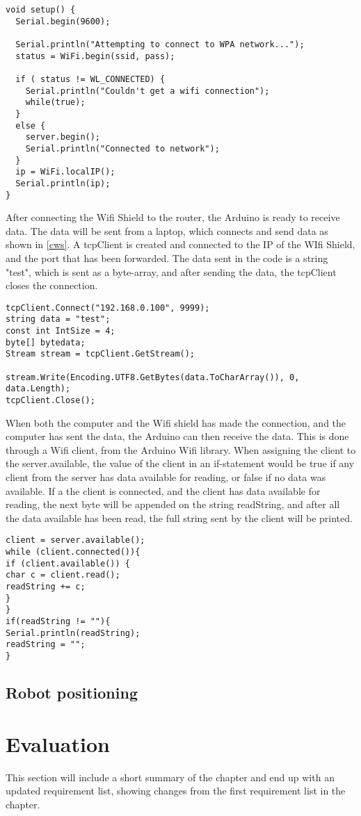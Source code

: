 \begin{lstlisting}[caption={Connecting the Wifi shield to the network}, label={ws}]
void setup() {
  Serial.begin(9600);

  Serial.println("Attempting to connect to WPA network...");
  status = WiFi.begin(ssid, pass);

  if ( status != WL_CONNECTED) { 
    Serial.println("Couldn't get a wifi connection");
    while(true);
  } 
  else {
    server.begin();
    Serial.println("Connected to network");
  }
  ip = WiFi.localIP();
  Serial.println(ip);
}
\end{lstlisting}

After connecting the Wifi Shield to the router, the Arduino is ready to receive data. The data will be sent from a laptop, which connects and send data as shown in \ref{cws}. A tcpClient is created and connected to the IP of the WIfi Shield, and the port that has been forwarded. The data sent in the code is a string "test", which is sent as a byte-array, and after sending the data, the tcpClient closes the connection.

\begin{lstlisting}[caption={Connecting the computer to the Wifi Shield}, label={cws}]
tcpClient.Connect("192.168.0.100", 9999);
string data = "test";
const int IntSize = 4;
byte[] bytedata;
Stream stream = tcpClient.GetStream();

stream.Write(Encoding.UTF8.GetBytes(data.ToCharArray()), 0, data.Length);
tcpClient.Close();
\end{lstlisting}

When both the computer and the Wifi shield has made the connection, and the computer has sent the data, the Arduino can then receive the data. This is done through a Wifi client, from the Arduino Wifi library. When assigning the client to the server.available, the value of the client in an if-statement would be true if any client from the server has data available for reading, or false if no data was available. If a the client is connected, and the client has data available for reading, the next byte will be appended on the string readString, and after all the data available has been read, the full string sent by the client will be printed.

\begin{lstlisting}[caption={Receiving data from the computer}, label={rdc}]
client = server.available();
while (client.connected()){
if (client.available()) {
char c = client.read(); 
readString += c;
}
}
if(readString != ""){
Serial.println(readString);
readString = "";
}
\end{lstlisting}

\subsection{Robot positioning}
\label{sec:Robot positioning Implementation}

\section{Evaluation}
\label{sec:i2Evaluation}
This section will include a short summary of the chapter and end up with an updated requirement list, showing changes from the first requirement list in the chapter. 